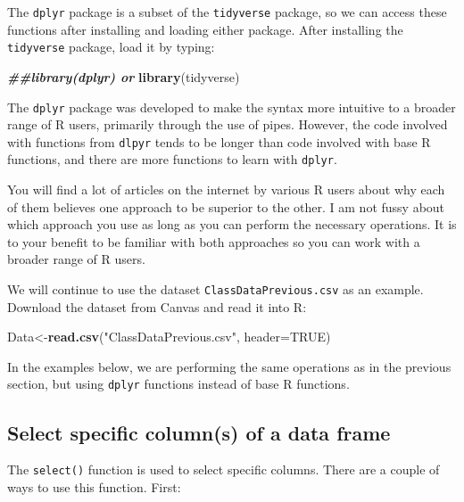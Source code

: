 \documentclass[
]{book}
\newenvironment{Shaded}{\begin{snugshade}}{\end{snugshade}}
\newcommand{\AttributeTok}[1]{\textcolor[rgb]{0.13,0.29,0.53}{#1}}
\newcommand{\ConstantTok}[1]{\textcolor[rgb]{0.56,0.35,0.01}{#1}}
\newcommand{\DocumentationTok}[1]{\textcolor[rgb]{0.56,0.35,0.01}{\textbf{\textit{#1}}}}
\newcommand{\FunctionTok}[1]{\textcolor[rgb]{0.13,0.29,0.53}{\textbf{#1}}}
\newcommand{\NormalTok}[1]{#1}
\newcommand{\OtherTok}[1]{\textcolor[rgb]{0.56,0.35,0.01}{#1}}
\newcommand{\StringTok}[1]{\textcolor[rgb]{0.31,0.60,0.02}{#1}}
\begin{document}
The \texttt{dplyr} package is a subset of the \texttt{tidyverse} package, so we can access these functions after installing and loading either package. After installing the \texttt{tidyverse} package, load it by typing:

\begin{Shaded}
\begin{Highlighting}[]
\DocumentationTok{\#\#library(dplyr) or}
\FunctionTok{library}\NormalTok{(tidyverse) }
\end{Highlighting}
\end{Shaded}

The \texttt{dplyr} package was developed to make the syntax more intuitive to a broader range of R users, primarily through the use of pipes. However, the code involved with functions from \texttt{dlpyr} tends to be longer than code involved with base R functions, and there are more functions to learn with \texttt{dplyr}.

You will find a lot of articles on the internet by various R users about why each of them believes one approach to be superior to the other. I am not fussy about which approach you use as long as you can perform the necessary operations. It is to your benefit to be familiar with both approaches so you can work with a broader range of R users.

We will continue to use the dataset \texttt{ClassDataPrevious.csv} as an example. Download the dataset from Canvas and read it into R:

\begin{Shaded}
\begin{Highlighting}[]
\NormalTok{Data}\OtherTok{\textless{}{-}}\FunctionTok{read.csv}\NormalTok{(}\StringTok{"ClassDataPrevious.csv"}\NormalTok{, }\AttributeTok{header=}\ConstantTok{TRUE}\NormalTok{)}
\end{Highlighting}
\end{Shaded}

In the examples below, we are performing the same operations as in the previous section, but using \texttt{dplyr} functions instead of base R functions.

\hypertarget{select-specific-columns-of-a-data-frame}{%
\subsection{Select specific column(s) of a data frame}\label{select-specific-columns-of-a-data-frame}}

The \texttt{select()} function is used to select specific columns. There are a couple of ways to use this function. First:
\end{document}
